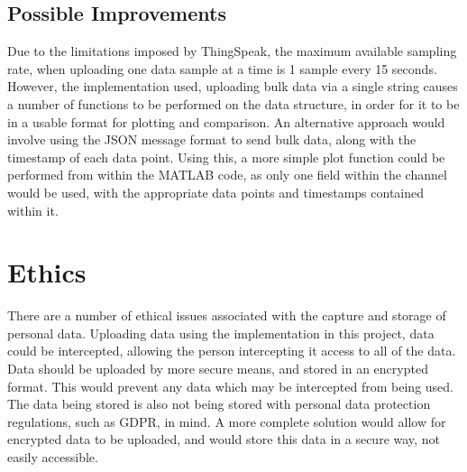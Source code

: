\documentclass[11pt,a4paper,headinclude=false,footinclude=false]{scrreprt}
\begin{document}
\hypertarget{possible-improvements}{%
\section{Possible Improvements}\label{possible-improvements}}

Due to the limitations imposed by ThingSpeak, the maximum available
sampling rate, when uploading one data sample at a time is 1 sample
every 15 seconds. However, the implementation used, uploading bulk data
via a single string causes a number of functions to be performed on the
data structure, in order for it to be in a usable format for plotting
and comparison. An alternative approach would involve using the JSON
message format to send bulk data, along with the timestamp of each data
point\cite{matlabbulk}. Using this, a more simple plot function could be
performed from within the MATLAB code, as only one field within the
channel would be used, with the appropriate data points and timestamps
contained within it.

\hypertarget{ethics}{%
\chapter{Ethics}\label{ethics}}

There are a number of ethical issues associated with the capture and
storage of personal data. Uploading data using the implementation in
this project, data could be intercepted, allowing the person
intercepting it access to all of the data. Data should be uploaded by
more secure means, and stored in an encrypted format. This would prevent
any data which may be intercepted from being used. The data being stored
is also not being stored with personal data protection regulations, such
as GDPR, in mind. A more complete solution would allow for encrypted
data to be uploaded, and would store this data in a secure way, not
easily accessible.
{}

\end{document}
